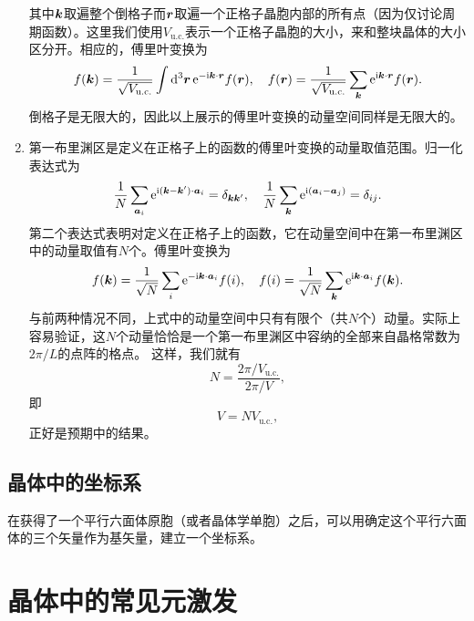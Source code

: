 \documentclass[hyperref, UTF8, a4paper]{ctexart}
\newcommand*{\ii}{\mathrm{i}}
\newcommand*{\ee}{\mathrm{e}}
\begin{document}
\begin{enumerate}
    其中$\vb*{k}$取遍整个倒格子而$\vb*{r}$取遍一个正格子晶胞内部的所有点（因为仅讨论周期函数）。这里我们使用$V_\text{u.c.}$表示一个正格子晶胞的大小，来和整块晶体的大小区分开。相应的，傅里叶变换为
    \begin{equation}
        f(\vb*{k}) = \frac{1}{\sqrt{V_\text{u.c.}}} \int \dd[3]{\vb*{r}} \ee^{- \ii \vb*{k} \cdot \vb*{r}} f(\vb*{r}), \quad f(\vb*{r}) = \frac{1}{\sqrt{V_\text{u.c.}}} \sum_{\vb*{k}} \ee^{\ii \vb*{k} \cdot \vb*{r}} f(\vb*{r}).
    \end{equation}
    倒格子是无限大的，因此以上展示的傅里叶变换的动量空间同样是无限大的。
    \item 第一布里渊区是定义在正格子上的函数的傅里叶变换的动量取值范围。归一化表达式为
    \begin{equation}
        \frac{1}{N} \sum_{\vb*{a}_i} \ee^{\ii (\vb*{k} - \vb*{k}') \cdot \vb*{a}_i} = \delta_{\vb*{k} \vb*{k}'}, \quad \frac{1}{N} \sum_{\vb*{k}} \ee^{\ii (\vb*{a}_i - \vb*{a}_j)} = \delta_{ij}.
    \end{equation}
    第二个表达式表明对定义在正格子上的函数，它在动量空间中在第一布里渊区中的动量取值有$N$个。傅里叶变换为
    \begin{equation}
        f(\vb*{k}) = \frac{1}{\sqrt{N}} \sum_{i} \ee^{- \ii \vb*{k} \cdot \vb*{a}_i} f(i), \quad f(i) = \frac{1}{\sqrt{N}} \sum_{\vb*{k}} \ee^{\ii \vb*{k} \cdot \vb*{a}_i} f(\vb*{k}).
    \end{equation}
    与前两种情况不同，上式中的动量空间中只有有限个（共$N$个）动量。实际上容易验证，这$N$个动量恰恰是一个第一布里渊区中容纳的全部来自晶格常数为$2\pi / L$的点阵的格点。
    这样，我们就有
    \[
        N = \frac{2\pi / V_\text{u.c.}}{2\pi / V},
    \]
    即
    \begin{equation}
        V = N V_\text{u.c.},
    \end{equation}
    正好是预期中的结果。
\end{enumerate}

\subsection{晶体中的坐标系}


在获得了一个平行六面体原胞（或者晶体学单胞）之后，可以用确定这个平行六面体的三个矢量作为基矢量，建立一个坐标系。


\section{晶体中的常见元激发}
\end{document}
